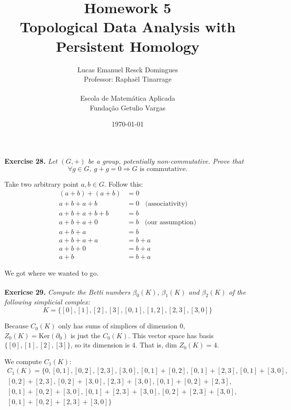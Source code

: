 \documentclass{article}
\title{Homework 5\\
    \large{Topological Data Analysis with Persistent Homology}}
\author{Lucas Emanuel Resck Domingues\\    
    Professor: Raphaël Tinarrage\\\\
    {Escola de Matemática Aplicada}\\
    {Fundação Getulio Vargas}}
\date{\today}
\begin{document}
    \maketitle

    \noindent \textbf{Exercise 28.} \textit{Let $(G, +)$ be a group, potentially non-commutative.
    Prove that
    $$\forall g \in G,\ g + g = 0 \Longrightarrow \textrm{$G$ is commutative.}$$}

    Take two arbitrary point $a, b \in G$.
    Follow this:
    \begin{align*}
        (a + b) + (a + b) &= 0 \\
        a + b + a + b &= 0 \ \ \ \ \textrm{(associativity)}\\
        a + b + a + b + b &= b \\
        a + b + a + 0 &= b \ \ \ \ \textrm{(our assumption)}\\
        a + b + a &= b \ \ \\
        a + b + a + a &= b + a \\
        a + b + 0 &= b + a \\
        a + b &= b + a
    \end{align*}

    We got where we wanted to go. \\\\

    \noindent \textbf{Exericse 29.} \textit{Compute the Betti numbers $\beta_0(K)$, $\beta_1(K)$ and $\beta_2(K)$ of the following simplicial complex:
    $$K = \{[0], [1], [2], [3], [0, 1], [1, 2],  [2, 3], [3, 0]\}$$}

    Because $C_0(K)$ only has sums of simplices of dimension 0, $Z_0(K) = \textrm{Ker}(\partial_0)$ is just the $C_0(K)$.
    This vector space has basis $\{[0], [1], [2], [3]\}$, so its dimension is 4. That is, $\textrm{dim } Z_0(K) = 4$.

    We compute $C_1(K)$:
    \begin{gather*}
        C_1(K) = \{0,
        [0, 1], [0, 2], [2, 3], [3, 0],
        [0, 1] + [0, 2], [0, 1] + [2, 3], [0, 1] + [3, 0], \\ [0, 2] + [2, 3], [0, 2] + [3, 0], [2, 3] + [3, 0],
        [0, 1] + [0, 2] + [2, 3], \\ [0, 1] + [0, 2] + [3, 0], [0, 1] + [2, 3] + [3, 0], [0, 2] + [2, 3] + [3, 0], \\
        [0, 1] + [0, 2] + [2, 3] + [3, 0]\}
    \end{gather*}
\end{document}
